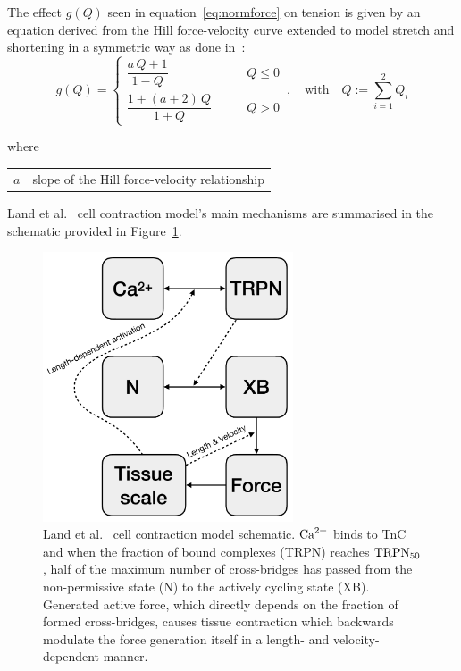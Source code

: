 \vspace{0.3cm}\noindent
The effect $g(Q)$ seen in equation~\eqref{eq:normforce} on tension is given by an equation derived from the Hill force-velocity curve extended to model stretch and shortening in a symmetric way as done in~\cite{Niederer:2006}:
%
\begin{equation}
    g(Q) = \begin{cases}
        \dfrac{a\,Q+1}{1-Q}\qquad & Q\le 0 \\
        \dfrac{1+(a+2)\,Q}{1+Q}\qquad & Q>0
    \end{cases}\,,\quad\text{with}\quad Q := \sum_{i=1}^2 Q_i
\end{equation}

\noindent
where

\vspace{0.2cm}
\begin{tabular}{ll}
    $a$ & slope of the Hill force-velocity relationship
\end{tabular}

\vspace{0.3cm}\noindent
Land et al.~\cite{Land:2012} cell contraction model's main mechanisms are summarised in the schematic provided in Figure~\ref{fig:cellcontrschematic}.

\begin{figure}[!ht]
    \myfloatalign
    \includegraphics[width=0.66\textwidth]{figures/chapter02/cellular_contraction_land.pdf}
    \caption{Land et al.~\cite{Land:2012} cell contraction model schematic. $\textrm{Ca}^{2+}$ binds to TnC and when the fraction of bound complexes (TRPN) reaches $\textrm{TRPN}_{50}$, half of the maximum number of cross-bridges has passed from the non-permissive state (N) to the actively cycling state (XB). Generated active force, which directly depends on the fraction of formed cross-bridges, causes tissue contraction which backwards modulate the force generation itself in a length- and velocity- dependent manner.}
    \label{fig:cellcontrschematic}
\end{figure}


